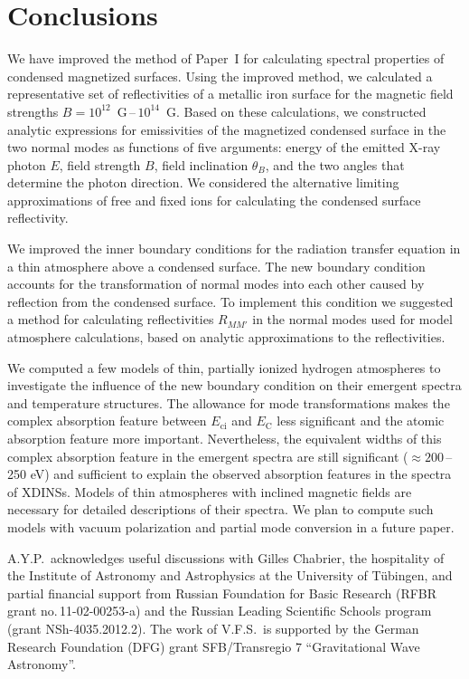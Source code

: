 \documentclass{aa}
\newcommand{\EC}{E_\mathrm{C}}
\newcommand{\Eci}{E_\mathrm{ci}}
\begin{document}
\section{Conclusions} 
\label{sect:concl}

We have improved the method of Paper~I
for calculating spectral properties of condensed magnetized 
surfaces.
Using the improved method, we
calculated a representative set of reflectivities of a metallic
iron surface for the magnetic field strengths
$B=10^{12}$~G\,--\,$10^{14}$~G. Based on these calculations, we
constructed  analytic expressions for emissivities of the
magnetized condensed surface in the two normal modes as functions
of five arguments: energy of the emitted X-ray photon $E$, field
strength $B$, field inclination $\theta_B$, and the two angles
that determine the photon direction. We considered the
alternative limiting approximations of free and fixed ions for 
calculating the condensed surface reflectivity.

We improved the inner boundary conditions for the
radiation transfer equation in a thin atmosphere above a
condensed surface. The new boundary condition accounts for
the transformation of normal modes into each other caused by 
reflection from the condensed surface. To implement this
condition we suggested a method for calculating 
reflectivities $R_{MM'}$ in the normal modes used for model
atmosphere calculations, based on analytic
approximations to the reflectivities.

We computed a few models of thin, partially ionized hydrogen
atmospheres to investigate the influence of the new boundary
condition on their emergent spectra and temperature
structures. The allowance for mode transformations makes the
complex absorption feature between $\Eci$ and $\EC$ less
significant and the atomic absorption feature more
important.  Nevertheless, the equivalent widths of this
complex absorption feature in the emergent spectra are still
significant ($\approx200$\,--\,250 eV) and sufficient to
explain the observed absorption features in the spectra of
XDINSs. Models of thin atmospheres with inclined magnetic
fields are necessary for detailed descriptions of their
spectra. We plan to compute such models with vacuum
polarization and partial mode conversion in a future paper.

\begin{acknowledgements}
A.Y.P.\ acknowledges useful discussions with Gilles
Chabrier, the hospitality of the Institute of Astronomy and
Astrophysics at the University of T\"ubingen, and partial
financial support from Russian Foundation for Basic Research
(RFBR grant no.\,11-02-00253-a) and the Russian Leading
Scientific Schools program (grant NSh-4035.2012.2).  The
work of V.F.S.~is supported by the German Research
Foundation (DFG) grant SFB/Transregio 7 ``Gravitational Wave
Astronomy''. 
\end{acknowledgements}
 
\end{document}
